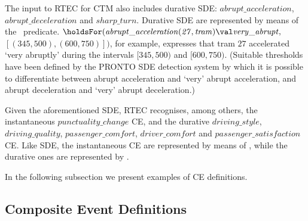 The input to RTEC for CTM also includes durative SDE: $\mathit{abrupt\_acceleration}$, $\mathit{abrupt\_deceleration}$ and $\mathit{sharp\_turn}$. Durative SDE are represented by means of the \holdsFor\ predicate. $\holdsFor\mathit{(abrupt\_acceleration(27, tram)\val very\_abrupt,}$ $\mathit{[(345, 500), (600, 750)])}$, for example, expresses that tram $\mathit{27}$ accelerated `very abruptly' during the intervals $\mathit{[345,500)}$ and $\mathit{[600,750)}$. (Suitable thresholds have been defined by the PRONTO SDE detection system by which it is possible to differentiate between abrupt acceleration and `very' abrupt acceleration, and abrupt deceleration and `very' abrupt deceleration.)

Given the aforementioned SDE, RTEC recognises, among others, the instantaneous $\mathit{punctuality\_change}$ CE, and the durative $\mathit{driving\_style}$, $\mathit{driving\_quality}$, $\mathit{passenger\_comfort}$, $\mathit{driver\_comfort}$ and $\mathit{passenger\_satisfaction}$ CE. Like SDE, the instantaneous CE are represented by means of \happensAt, while the durative ones are represented by \holdsFor.

In the following subsection we present examples of CE definitions.

\subsection{Composite Event Definitions}\label{sec:ctm-definitions} 


